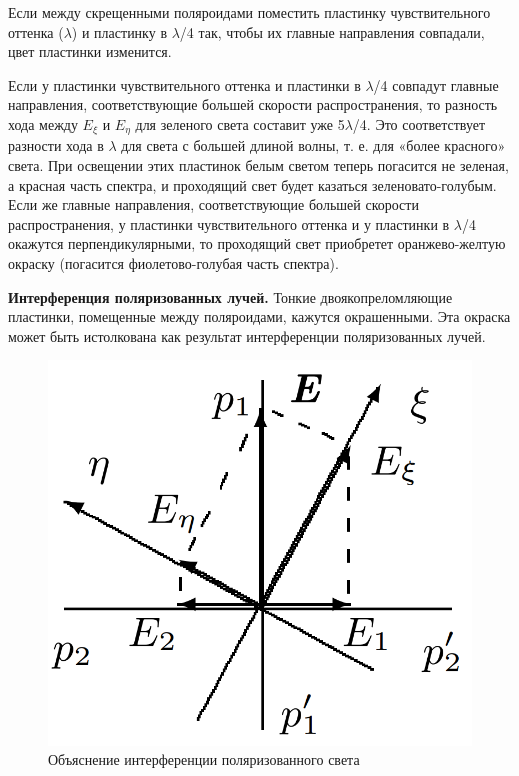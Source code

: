 \documentclass[a4paper,12pt]{article} %
\begin{document}
	Если между скрещенными поляроидами поместить пластинку чувствительного оттенка ($\lambda$) и пластинку в $\lambda$/4 так, чтобы их главные направления совпадали, цвет пластинки изменится.
	
	Если у пластинки чувствительного оттенка и пластинки в $\lambda$/4 совпадут главные направления, соответствующие большей скорости распространения, то разность хода между $E_{\xi}$ и $E_{\eta}$ для зеленого света составит уже 5$\lambda$/4. Это соответствует разности хода в $\lambda$ для света с большей длиной волны, т. е. для «более красного» света. При освещении этих пластинок белым светом теперь погасится не зеленая, а красная часть спектра, и проходящий свет будет казаться зеленовато-голубым. Если же главные направления, соответствующие большей скорости распространения, у пластинки чувствительного оттенка и у пластинки в $\lambda$/4 окажутся перпендикулярными, то проходящий свет приобретет оранжево-желтую окраску (погасится фиолетово-голубая часть спектра).
	
	\textbf{Интерференция поляризованных лучей.} Тонкие двоякопреломляющие пластинки, помещенные между поляроидами, кажутся окрашенными. Эта окраска может быть истолкована как результат интерференции поляризованных лучей.
	\begin{figure}[h!]
		\centering
		\includegraphics[scale=0.5]{Pictures/Interference}
		\caption{Объяснение интерференции поляризованного света}
	\end{figure}
\end{document}
